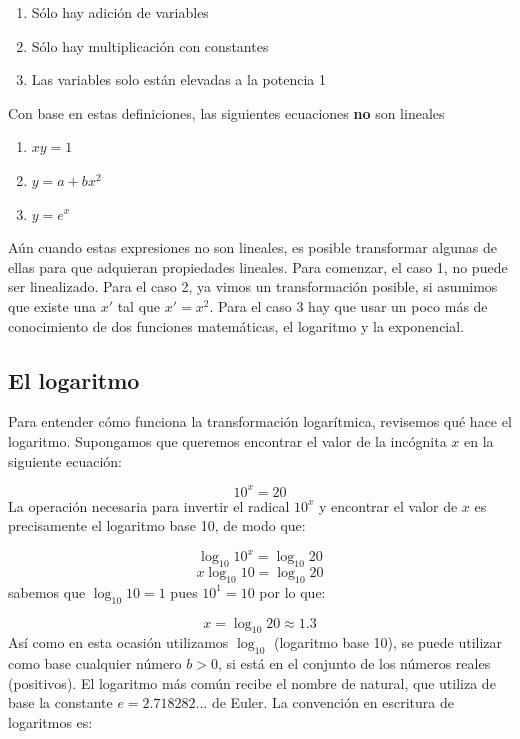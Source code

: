 \documentclass[
]{book}
\providecommand{\tightlist}{%
  \setlength{\itemsep}{0pt}\setlength{\parskip}{0pt}}
\begin{document}
\begin{enumerate}
\def\labelenumi{\arabic{enumi}.}
\tightlist
\item
  Sólo hay adición de variables
\item
  Sólo hay multiplicación con constantes
\item
  Las variables solo están elevadas a la potencia 1
\end{enumerate}

Con base en estas definiciones, las siguientes ecuaciones \textbf{no} son lineales

\begin{enumerate}
\def\labelenumi{\arabic{enumi}.}
\tightlist
\item
  \(xy = 1\)
\item
  \(y = a + b x^2\)
\item
  \(y = e^x\)
\end{enumerate}

Aún cuando estas expresiones no son lineales, es posible transformar algunas de ellas para que adquieran propiedades lineales. Para comenzar, el caso 1, no puede ser linealizado. Para el caso 2, ya vimos un transformación posible, si asumimos que existe una \(x'\) tal que \(x' = x^2\). Para el caso 3 hay que usar un poco más de conocimiento de dos funciones matemáticas, el logaritmo y la exponencial.

\hypertarget{el-logaritmo}{%
\subsection{El logaritmo}\label{el-logaritmo}}

Para entender cómo funciona la transformación logarítmica, revisemos qué hace el logaritmo. Supongamos que queremos encontrar el valor de la incógnita \(x\) en la siguiente ecuación:

\[10^x = 20\]
La operación necesaria para invertir el radical \(10^x\) y encontrar el valor de \(x\) es precisamente el logaritmo base 10, de modo que:

\[\log_{10} 10^x = \log_{10} 20\]
\[x \log_{10} 10 = \log_{10} 20\]
sabemos que \(\log_{10} 10 = 1\) pues \(10^1 = 10\) por lo que:

\[x = \log_{10} 20 \approx 1.3\]
Así como en esta ocasión utilizamos \(\log_{10}\) (logaritmo base 10), se puede utilizar como base cualquier número \(b > 0\), si está en el conjunto de los números reales (positivos). El logaritmo más común recibe el nombre de natural, que utiliza de base la constante \(e = 2.718282 ...\) de Euler. La convención en escritura de logaritmos es:
\end{document}
